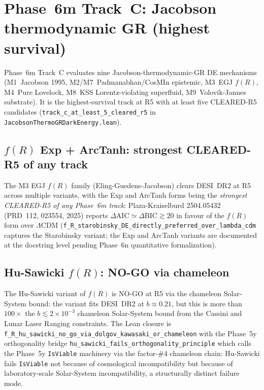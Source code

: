 \documentclass[aps,prd,reprint,nofootinbib,superscriptaddress]{revtex4-2}
\begin{document}


\section{Phase~6m Track~C: Jacobson thermodynamic GR (highest survival)}
\label{sec:phase6m-track-c}

Phase~6m Track~C evaluates nine Jacobson-thermodynamic-GR DE mechanisms
(M1~Jacobson 1995, M2/M7~Padmanabhan/CosMIn epistemic, M3~EGJ $f(R)$,
M4~Pure Lovelock, M8~KSS Lorentz-violating superfluid,
M9~Volovik-Jannes substrate). It is the highest-survival track at R5 with
at least five CLEARED-R5 candidates
(\texttt{track\_c\_at\_least\_5\_cleared\_r5} in
\texttt{JacobsonThermoGRDarkEnergy.lean}).

\subsection{$f(R)$ Exp + ArcTanh: strongest CLEARED-R5 of any track}
\label{subsec:phase6m-track-c-fR}

The M3 EGJ $f(R)$ family (Eling-Guedens-Jacobson) clears DESI~DR2 at
R5 across multiple variants, with the Exp and ArcTanh forms being the
\emph{strongest CLEARED-R5 of any Phase~6m track}: Plaza-Kraiselburd
2504.05432~\cite{PlazaKraiselburd2025fR} (PRD~112, 023554, 2025) reports
$\Delta\!\text{AIC} \simeq \Delta\!\text{BIC} \gtrsim 20$ in favour of
the $f(R)$ form over $\Lambda$CDM
(\texttt{f\_R\_starobinsky\_DE\_directly\_preferred\_over\_lambda\_cdm}
captures the Starobinsky variant; the Exp and ArcTanh variants are
documented at the docstring level pending Phase~6n quantitative
formalization).

\subsection{Hu-Sawicki $f(R)$: NO-GO via chameleon}
\label{subsec:phase6m-track-c-hu-sawicki}

The Hu-Sawicki variant of $f(R)$ is NO-GO at R5 via the chameleon
Solar-System bound: the variant fits DESI~DR2 at $b \approx 0.21$, but
this is more than $100\times$ the $b \lesssim 2 \times 10^{-3}$ chameleon
Solar-System bound from the Cassini and Lunar Laser Ranging
constraints. The Lean closure is
\texttt{f\_R\_hu\_sawicki\_no\_go\_via\_dolgov\_kawasaki\_or\_chameleon}
with the Phase~5y orthogonality bridge
\texttt{hu\_sawicki\_fails\_orthogonality\_principle} which calls the
Phase~5y \texttt{IsViable} machinery via the factor-\#4 chameleon
chain: Hu-Sawicki fails \texttt{IsViable} not because of cosmological
incompatibility but because of laboratory-scale Solar-System
incompatibility, a structurally distinct failure mode.
\end{document}
